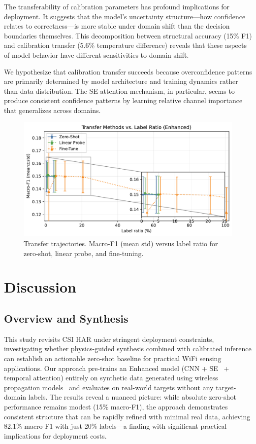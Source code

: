 \documentclass[journal]{IEEEtran}
\begin{document}
The transferability of calibration parameters has profound implications for deployment. It suggests that the model's uncertainty structure—how confidence relates to correctness—is more stable under domain shift than the decision boundaries themselves. This decomposition between structural accuracy (15\% F1) and calibration transfer (5.6\% temperature difference) reveals that these aspects of model behavior have different sensitivities to domain shift.

We hypothesize that calibration transfer succeeds because overconfidence patterns are primarily determined by model architecture and training dynamics rather than data distribution. The SE attention mechanism, in particular, seems to produce consistent confidence patterns by learning relative channel importance that generalizes across domains.

\begin{figure}[t]
\centering
\includegraphics[width=\columnwidth]{plots/transfer_compare.pdf}
\caption{Transfer trajectories. Macro-F1 (mean\,\textpm\,std) versus label ratio for zero-shot, linear probe, and fine-tuning.}
\label{fig:transfer_compare}
\end{figure}

\section{Discussion}

\subsection{Overview and Synthesis}
This study revisits CSI HAR under stringent deployment constraints, investigating whether physics-guided synthesis combined with calibrated inference can establish an actionable zero-shot baseline for practical WiFi sensing applications. Our approach pre-trains an Enhanced model (CNN + SE~\cite{se_networks2018} + temporal attention) entirely on synthetic data generated using wireless propagation models~\cite{saleh1987statistical,goldsmith2005wireless} and evaluates on real-world targets without any target-domain labels. The results reveal a nuanced picture: while absolute zero-shot performance remains modest (15\% macro-F1), the approach demonstrates consistent structure that can be rapidly refined with minimal real data, achieving 82.1\% macro-F1 with just 20\% labels—a finding with significant practical implications for deployment costs.
\end{document}

